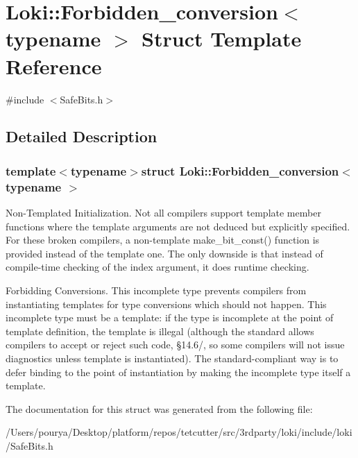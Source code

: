 \hypertarget{structLoki_1_1Forbidden__conversion}{}\section{Loki\+:\+:Forbidden\+\_\+conversion$<$ typename $>$ Struct Template Reference}
\label{structLoki_1_1Forbidden__conversion}


{\ttfamily \#include $<$Safe\+Bits.\+h$>$}



\subsection{Detailed Description}
\subsubsection*{template$<$typename$>$struct Loki\+::\+Forbidden\+\_\+conversion$<$ typename $>$}

\begin{DoxyParagraph}{Non-\/\+Templated Initialization.}
Not all compilers support template member functions where the template arguments are not deduced but explicitly specified. For these broken compilers, a non-\/template make\+\_\+bit\+\_\+const() function is provided instead of the template one. The only downside is that instead of compile-\/time checking of the index argument, it does runtime checking. 
\end{DoxyParagraph}
\begin{DoxyParagraph}{Forbidding Conversions.}
This incomplete type prevents compilers from instantiating templates for type conversions which should not happen. This incomplete type must be a template\+: if the type is incomplete at the point of template definition, the template is illegal (although the standard allows compilers to accept or reject such code, §14.6/, so some compilers will not issue diagnostics unless template is instantiated). The standard-\/compliant way is to defer binding to the point of instantiation by making the incomplete type itself a template. 
\end{DoxyParagraph}


The documentation for this struct was generated from the following file\+:\begin{DoxyCompactItemize}
\item 
/\+Users/pourya/\+Desktop/platform/repos/tetcutter/src/3rdparty/loki/include/loki/Safe\+Bits.\+h\end{DoxyCompactItemize}
